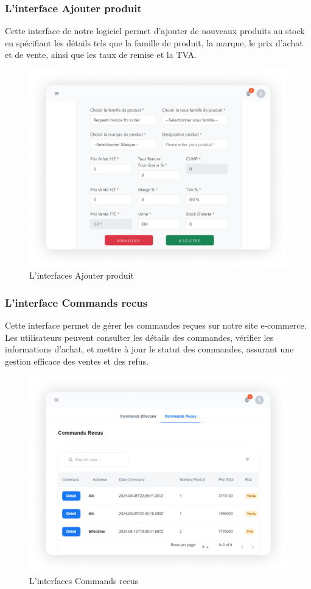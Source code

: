 \documentclass[edit,12pt,a4paper,ChapStyle,oneside,doubleinterligne]{report}
\begin{document}
\subsubsection{L'interface Ajouter produit}
Cette interface de notre logiciel permet d'ajouter de nouveaux produits au stock en spécifiant les détails tels que la famille de produit, la marque, le prix d'achat et de vente, ainsi que les taux de remise et la TVA.
  \begin{figure} [H]
    \centering
    \includegraphics[width=1\textwidth]{images/ajouter produit 1.png}
    \caption{L'interfaces Ajouter produit}
    \label{fig:Ajouter produit}
\end{figure}

\subsubsection{L'interface Commands recus}
Cette interface permet de gérer les commandes reçues sur notre site e-commerce. Les utilisateurs peuvent consulter les détails des commandes, vérifier les informations d'achat, et mettre à jour le statut des commandes, assurant une gestion efficace des ventes et des refus.
  \begin{figure} [H]
    \centering
    \includegraphics[width=1\textwidth]{images/commands recus 1.png}
    \caption{L'interfaces Commands recus}
    \label{fig:Commands recus}
\end{figure}
\end{document}
